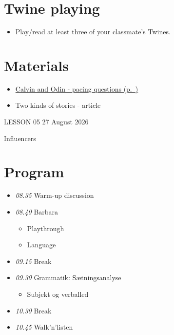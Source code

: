 \documentclass[11pt,a4paper,oneside]{book}
\begin{document}
\section*{Twine playing}

\begin{itemize}
\item Play/read at least three of your classmate's Twines.
\end{itemize}

\section*{Materials}

\begin{itemize}
\item \hyperref[worksheet-6]{Calvin and Odin - pacing questions (p.~\pageref*{worksheet-6})}
\item Two kinds of stories - article
\end{itemize}

\clearpage{}
{\color{blue}\small LESSON 05 \hfill 27 August 2026\par}
\vspace{4mm}
{\displayfont\color{navy}\fontsize{30}{34}\selectfont Influencers\par}\vspace{4mm}

\section*{Program}

\begin{itemize}
\item \emph{08.35} Warm-up discussion
\item \emph{08.40} Barbara

\begin{itemize}
\item Playthrough
\item Language
\end{itemize}

\item \emph{09.15} Break
\item \emph{09.30} Grammatik: Sætningsanalyse

\begin{itemize}
\item Subjekt og verballed
\end{itemize}

\item \emph{10.30} Break
\item \emph{10.45} Walk'n'listen
\end{itemize}
\end{document}
